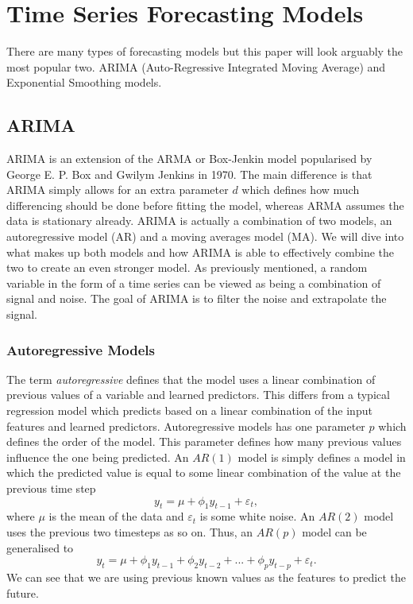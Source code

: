 \documentclass{article}
\begin{document}
  \section{Time Series Forecasting Models}
    There are many types of forecasting models but this paper will look arguably the most popular two. ARIMA (Auto-Regressive Integrated Moving Average) and Exponential Smoothing models. 
  \subsection{ARIMA}
    ARIMA is an extension of the ARMA or Box-Jenkin model popularised by George E. P. Box and Gwilym Jenkins in 1970. The main difference is that ARIMA simply allows for an extra parameter $d$ which defines how much differencing should be done before fitting the model, whereas ARMA assumes the data is stationary already. 
    ARIMA is actually a combination of two models, an autoregressive model (AR) and a moving averages model (MA). We will dive into what makes up both models and how ARIMA is able to effectively combine the two to create an even stronger model.
    As previously mentioned, a random variable in the form of a time series can be viewed as being a combination of signal and noise. The goal of ARIMA is to filter the noise and extrapolate the signal.
  \subsubsection{Autoregressive Models}
    The term \emph{autoregressive} defines that the model uses a linear combination of previous values of a variable and learned predictors. This differs from a typical regression model which predicts based on a linear combination of the input features and learned predictors.
    Autoregressive models has one parameter $p$ which defines the order of the model. This parameter defines how many previous values influence the one being predicted. 
    An $AR(1)$ model is simply defines a model in which the predicted value is equal to some linear combination of the value at the previous time step
    \begin{equation}
      y_t = \mu + \phi_1 y_{t-1} + \varepsilon_t,
    \end{equation}
    where $\mu$ is the mean of the data and $\varepsilon_t$ is some white noise.
    An $AR(2)$ model uses the previous two timesteps as so on.
    Thus, an $AR(p)$ model can be generalised to
    \begin{equation}
      y_t = \mu + \phi_1 y_{t-1} + \phi_2 y_{t-2} + ... + \phi_p y_{t-p} + \varepsilon_t.
    \end{equation}
    We can see that we are using previous known values as the features to predict the future. 
\end{document}
